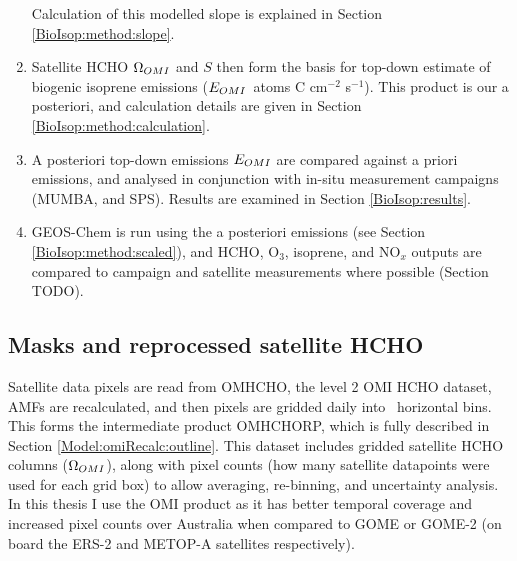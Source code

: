 \begin{enumerate}
        Calculation of this modelled slope is explained in Section \ref{BioIsop:method:slope}.
      \item 
        Satellite HCHO $\Omega_{OMI}$ and $S$ then form the basis for top-down estimate of biogenic isoprene emissions ($E_{OMI}$~atoms C cm$^{-2}$ s$^{-1}$).
        This product is our a posteriori, and calculation details are given in Section \ref{BioIsop:method:calculation}.
      \item 
        A posteriori top-down emissions $E_{OMI}$ are compared against a priori emissions, and analysed in conjunction with in-situ measurement campaigns (MUMBA, and SPS).
        Results are examined in Section \ref{BioIsop:results}.
      \item 
        GEOS-Chem is run using the a posteriori emissions (see Section \ref{BioIsop:method:scaled}), and HCHO, O$_3$, isoprene, and NO$_x$ outputs are compared to campaign and satellite measurements where possible (Section TODO).
    \end{enumerate}
    
    
  

  \subsection{Masks and reprocessed satellite HCHO}
    
    Satellite data pixels are read from OMHCHO, the level 2 OMI HCHO dataset, AMFs are recalculated, and then pixels are gridded daily into \highhr ~horizontal bins. 
    This forms the intermediate product OMHCHORP, which is fully described in Section \ref{Model:omiRecalc:outline}.
    This dataset includes gridded satellite HCHO columns ($\Omega_{OMI}$), along with pixel counts (how many satellite datapoints were used for each grid box) to allow averaging, re-binning, and uncertainty analysis.
    In this thesis I use the OMI product as it has better temporal coverage and increased pixel counts over Australia when compared to GOME or GOME-2 (on board the ERS-2 and METOP-A satellites respectively).
    
